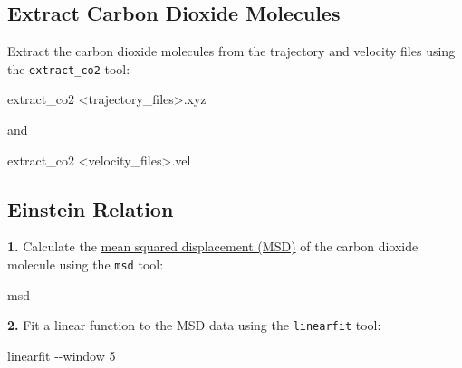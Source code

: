 \documentclass[
  letterpaper,
]{article}
\newenvironment{Shaded}{\begin{snugshade}}{\end{snugshade}}
\newcommand{\AttributeTok}[1]{\textcolor[rgb]{0.40,0.45,0.13}{#1}}
\newcommand{\ExtensionTok}[1]{\textcolor[rgb]{0.00,0.23,0.31}{#1}}
\newcommand{\NormalTok}[1]{\textcolor[rgb]{0.00,0.23,0.31}{#1}}
\newcommand{\OperatorTok}[1]{\textcolor[rgb]{0.37,0.37,0.37}{#1}}
\begin{document}
\hypertarget{extract-carbon-dioxide-molecules}{%
\subsection*{Extract Carbon Dioxide
Molecules}\label{extract-carbon-dioxide-molecules}}


Extract the carbon dioxide molecules from the trajectory and velocity
files using the \texttt{extract\_co2} tool:

\begin{Shaded}
\begin{Highlighting}[]
\ExtensionTok{extract\_co2} \OperatorTok{\textless{}}\NormalTok{trajectory\_files}\OperatorTok{\textgreater{}}\NormalTok{.xyz}
\end{Highlighting}
\end{Shaded}

and

\begin{Shaded}
\begin{Highlighting}[]
\ExtensionTok{extract\_co2} \OperatorTok{\textless{}}\NormalTok{velocity\_files}\OperatorTok{\textgreater{}}\NormalTok{.vel}
\end{Highlighting}
\end{Shaded}

\hypertarget{einstein-relation}{%
\subsection*{Einstein Relation}\label{einstein-relation}}


\textbf{1.} Calculate the \protect\hyperlink{einstein-relation}{mean
squared displacement (MSD)} of the carbon dioxide molecule using the
\texttt{msd} tool:

\begin{Shaded}
\begin{Highlighting}[]
\ExtensionTok{msd}
\end{Highlighting}
\end{Shaded}

\textbf{2.} Fit a linear function to the MSD data using the
\texttt{linearfit} tool:

\begin{Shaded}
\begin{Highlighting}[]
\ExtensionTok{linearfit} \AttributeTok{{-}{-}window}\NormalTok{ 5}
\end{Highlighting}
\end{Shaded}
\end{document}
